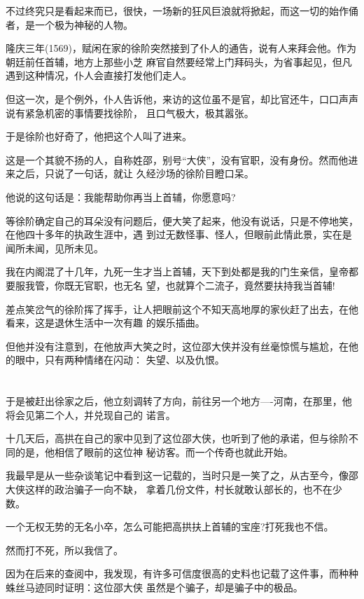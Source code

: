 \documentclass[11pt,a4paper,onecolumn]{article}
\begin{document}
不过终究只是看起来而已，很快，一场新的狂风巨浪就将掀起，而这一切的始作俑者，是一个极为神秘的人物。

隆庆三年(1569)，赋闲在家的徐阶突然接到了仆人的通告，说有人来拜会他。作为朝廷前任首辅，地方上那些小芝
麻官自然要经常上门拜码头，为省事起见，但凡遇到这种情况，仆人会直接打发他们走人。

但这一次，是个例外，仆人告诉他，来访的这位虽不是官，却比官还牛，口口声声说有紧急机密的事情要找徐阶，
且口气极大，极其嚣张。

于是徐阶也好奇了，他把这个人叫了进来。

这是一个其貌不扬的人，自称姓邵，别号``大侠''，没有官职，没有身份。然而他进来之后，只说了一句话，就让
久经沙场的徐阶目瞪口呆。

他说的这句话是：我能帮助你再当上首辅，你愿意吗?

等徐阶确定自己的耳朵没有问题后，便大笑了起来，他没有说话，只是不停地笑，在他四十多年的执政生涯中，遇
到过无数怪事、怪人，但眼前此情此景，实在是闻所未闻，见所未见。

我在内阁混了十几年，九死一生才当上首辅，天下到处都是我的门生亲信，皇帝都要服我管，你既无官职，也无名
望，也就算个二流子，竟然要扶持我当首辅!

差点笑岔气的徐阶挥了挥手，让人把眼前这个不知天高地厚的家伙赶了出去，在他看来，这是退休生活中一次有趣
的娱乐插曲。

但他并没有注意到，在他放声大笑之时，这位邵大侠并没有丝毫惊慌与尴尬，在他的眼中，只有两种情绪在闪动：
失望、以及仇恨。

\section[\thesection]{}

于是被赶出徐家之后，他立刻调转了方向，前往另一个地方----河南，在那里，他将会见第二个人，并兑现自己的
诺言。

十几天后，高拱在自己的家中见到了这位邵大侠，也听到了他的承诺，但与徐阶不同的是，他相信了眼前的这位神
秘访客。而一个传奇也就此开始。

我最早是从一些杂谈笔记中看到这一记载的，当时只是一笑了之，从古至今，像邵大侠这样的政治骗子一向不缺，
拿着几份文件，村长就敢认部长的，也不在少数。

一个无权无势的无名小卒，怎么可能把高拱扶上首辅的宝座?打死我也不信。

然而打不死，所以我信了。

因为在后来的查阅中，我发现，有许多可信度很高的史料也记载了这件事，而种种蛛丝马迹同时证明：这位邵大侠
虽然是个骗子，却是骗子中的极品。
\end{document}
